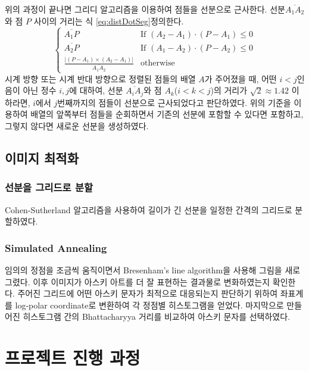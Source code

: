 \documentclass[conference]{IEEEtran}
\begin{document}
위의 과정이 끝나면 그리디 알고리즘을 이용하여 점들을 선분으로 근사한다.
선분$\overline{A_1A_2}$와 점 $P$ 사이의 거리는 식 \ref{eq:distDotSeg}\로 정의한다.
\begin{equation}
    \begin{cases}
        \overline{A_1P} & \text{If } (A_2 - A_1) \cdot (P - A_1) \leq 0 \\
        \overline{A_2P} & \text{If } (A_1 - A_2) \cdot (P - A_2) \leq 0 \\
        \frac{|(P - A_1)\times (A_2 - A_1)|}{\overline{A_1A_2}} & \text{otherwise}
    \end{cases}
    \label{eq:distDotSeg}
\end{equation}
시계 방향 또는 시계 반대 방향으로 정렬된 점들의 배열 $A$가 주어졌을 때, 어떤 $i < j$인 음이 아닌 정수 $i, j$에 대하여,
선분 $\overline{A_iA_j}$와 점 $A_k$($i < k < j$)의 거리가 $\sqrt 2 \approx 1.42$ 이하라면, $i$에서 $j$번째까지의 점들이 선분으로 근사되었다고 판단하였다.
위의 기준을 이용하여 배열의 앞쪽부터 점들을 순회하면서 기존의 선분에 포함할 수 있다면 포함하고, 그렇지 않다면 새로운 선분을 생성하였다.

\subsection{이미지 최적화}

\subsubsection{선분을 그리드로 분할}
Cohen-Sutherland 알고리즘\cite{cohen-sutherland}을 사용하여 길이가 긴 선분을 일정한 간격의 그리드로 분할하였다.

\subsubsection{Simulated Annealing}
임의의 정점을 조금씩 움직이면서 Bresenham's line algorithm\cite{bresenham-line}을 사용해 그림을 새로 그렸다.
이후 이미지가 아스키 아트를 더 잘 표현하는 결과물로 변화하였는지 확인한다.
주어진 그리드에 어떤 아스키 문자가 최적으로 대응되는지 판단하기 위하여 좌표계를 log-polar coordinate로 변환하여 각 정점별 히스토그램을 얻었다.\cite{log-polar}
마지막으로 만들어진 히스토그램 간의 Bhattacharyya 거리를 비교하여 아스키 문자를 선택하였다.\cite{st-ba-ascii-art}\cite{bhattacharyya}


\section{프로젝트 진행 과정}
\end{document}
